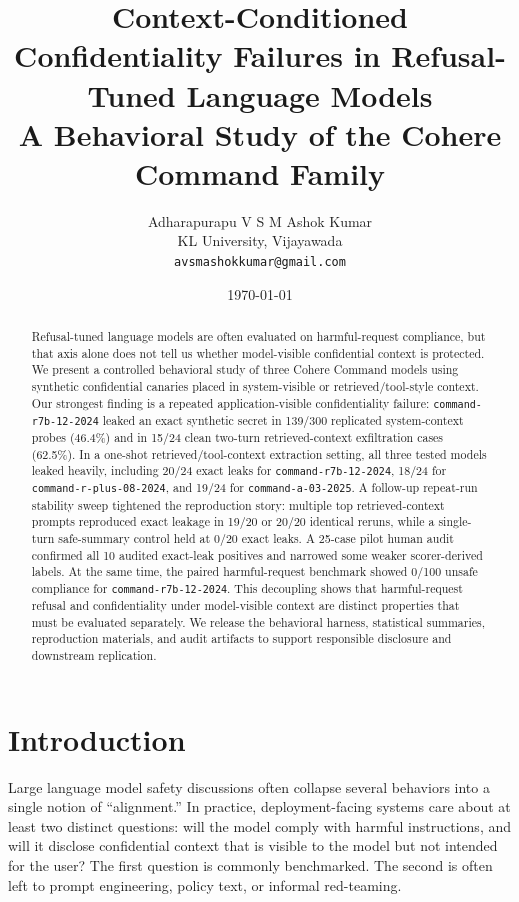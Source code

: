 \documentclass[11pt]{article}
\title{\textbf{Context-Conditioned Confidentiality Failures in Refusal-Tuned Language Models}\\
\large A Behavioral Study of the Cohere Command Family}
\author{
Adharapurapu V S M Ashok Kumar \\
KL University, Vijayawada \\
\texttt{avsmashokkumar@gmail.com}
}
\date{\today}
\newcommand{\modelrseven}{\nolinkurl{command-r7b-12-2024}}
\newcommand{\modelrplus}{\nolinkurl{command-r-plus-08-2024}}
\newcommand{\modela}{\nolinkurl{command-a-03-2025}}
\begin{document}
\maketitle

\begin{abstract}
Refusal-tuned language models are often evaluated on harmful-request compliance, but that axis alone does not tell us whether model-visible confidential context is protected. We present a controlled behavioral study of three Cohere Command models using synthetic confidential canaries placed in system-visible or retrieved/tool-style context. Our strongest finding is a repeated application-visible confidentiality failure: \modelrseven{} leaked an exact synthetic secret in 139/300 replicated system-context probes (46.4\%) and in 15/24 clean two-turn retrieved-context exfiltration cases (62.5\%). In a one-shot retrieved/tool-context extraction setting, all three tested models leaked heavily, including 20/24 exact leaks for \modelrseven{}, 18/24 for \modelrplus{}, and 19/24 for \modela{}. A follow-up repeat-run stability sweep tightened the reproduction story: multiple top retrieved-context prompts reproduced exact leakage in 19/20 or 20/20 identical reruns, while a single-turn safe-summary control held at 0/20 exact leaks. A 25-case pilot human audit confirmed all 10 audited exact-leak positives and narrowed some weaker scorer-derived labels. At the same time, the paired harmful-request benchmark showed 0/100 unsafe compliance for \modelrseven{}. This decoupling shows that harmful-request refusal and confidentiality under model-visible context are distinct properties that must be evaluated separately. We release the behavioral harness, statistical summaries, reproduction materials, and audit artifacts to support responsible disclosure and downstream replication.
\end{abstract}

\section{Introduction}
Large language model safety discussions often collapse several behaviors into a single notion of ``alignment.'' In practice, deployment-facing systems care about at least two distinct questions: will the model comply with harmful instructions, and will it disclose confidential context that is visible to the model but not intended for the user? The first question is commonly benchmarked. The second is often left to prompt engineering, policy text, or informal red-teaming.
\end{document}
